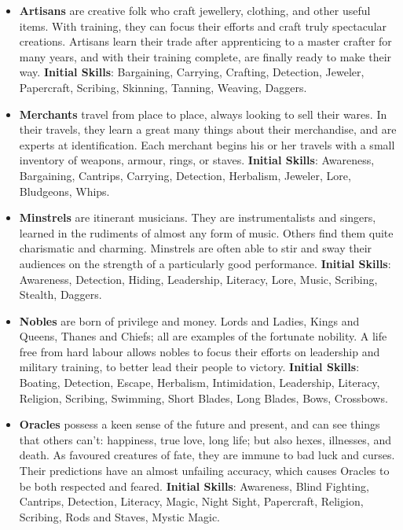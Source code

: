 \documentclass{article}
\begin{document}
\begin{itemize}
\item {\bf Artisans} are creative folk who craft jewellery, clothing, and 
other useful items.  With training, they can focus their efforts and craft 
truly spectacular creations.  Artisans learn their trade after apprenticing
to a master crafter for many years, and with their training complete, are
finally ready to make their way.  \textbf{Initial Skills}: Bargaining,
Carrying, Crafting, Detection, Jeweler, Papercraft, Scribing, Skinning,
Tanning, Weaving, Daggers.

\item {\bf Merchants} travel from place to place, always looking to sell 
their wares.  In their travels, they learn a great many things about their 
merchandise, and are experts at identification.  Each merchant begins his 
or her travels with a small inventory of weapons, armour, rings, or staves.
\textbf{Initial Skills}: Awareness, Bargaining, Cantrips, Carrying,
Detection, Herbalism, Jeweler, Lore, Bludgeons, Whips.

\item {\bf Minstrels} are itinerant musicians.  They are instrumentalists 
and singers, learned in the rudiments of almost any form of music.  Others 
find them quite charismatic and charming.  Minstrels are often able to stir
and sway their audiences on the strength of a particularly good performance.
\textbf{Initial Skills}: Awareness, Detection, Hiding, Leadership, 
Literacy, Lore, Music, Scribing, Stealth, Daggers.

\item {\bf Nobles} are born of privilege and money.  Lords and Ladies, 
Kings and Queens, Thanes and Chiefs; all are examples of the fortunate 
nobility.  A life free from hard labour allows nobles to focus their 
efforts on leadership and military training, to better lead their people 
to victory.  \textbf{Initial Skills}: Boating, Detection, Escape, 
Herbalism, Intimidation, Leadership, Literacy, Religion, Scribing,
Swimming, Short Blades, Long Blades, Bows, Crossbows.

\item {\bf Oracles} possess a keen sense of the future and present, and can
see things that others can't: happiness, true love, long life; but also 
hexes, illnesses, and death.  As favoured creatures of fate, they are 
immune to bad luck and curses.  Their predictions have an almost unfailing 
accuracy, which causes Oracles to be both respected and feared.
\textbf{Initial Skills}: Awareness, Blind Fighting, Cantrips, Detection,
Literacy, Magic, Night Sight, Papercraft, Religion, Scribing, Rods and
Staves, Mystic Magic.


\end{itemize}
\end{document}
